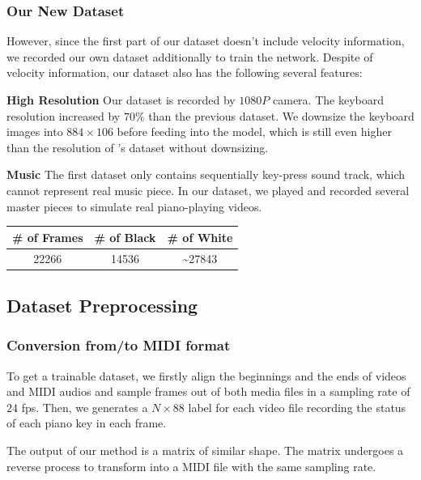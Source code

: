 \documentclass[10pt,twocolumn,letterpaper]{article}
\begin{document}
   \subsubsection{Our New Dataset}

   However, since the first part of our dataset doesn't include velocity information, we recorded our own dataset additionally to train the network.
   Despite of velocity information, our dataset also has the following several features:

   \textbf{High Resolution} Our dataset is recorded by $1080P$ camera. The keyboard resolution increased by $70\%$ than the previous dataset. We downsize the keyboard images into \(884 \times 106\) before feeding into the model, which is still even higher than the resolution of \cite{Akbari}'s dataset without downsizing.

   \textbf{Music} The first dataset only contains sequentially key-press sound track, which cannot represent real music piece. 
   In our dataset, we played and recorded several master pieces to simulate real piano-playing videos.\\

   \begin{minipage}{0.9\linewidth}
      \centering
   \begin{tabular}{ccc}
      \toprule
      \# of Frames&\# of Black&\# of White\\
      \midrule
      22266&14536&\sim27843\\
      \bottomrule
      \end{tabular}
       \label{tab:ourdataset} 
   \end{minipage}

\subsection{Dataset Preprocessing}

\subsubsection{Conversion from/to MIDI format}

To get a trainable dataset, we firstly align the beginnings and the ends of videos and MIDI audios and sample frames out of both media files in a sampling rate of $24$ fps. 
Then, we generates a \(N \times 88\) label for each video file recording the status of each piano key in each frame.

The output of our method is a matrix of similar shape. 
The matrix undergoes a reverse process to transform into a MIDI file with the same sampling rate.
\end{document}
